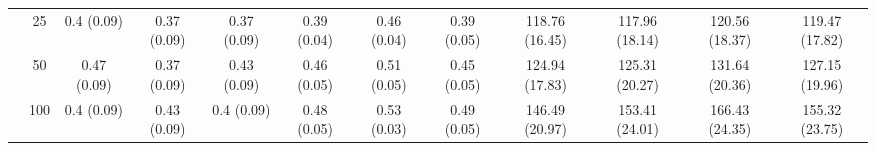 \documentclass[11pt]{article}
\theoremstyle{definition}
\begin{document}
\begin{table}[H]
\begin{center}
{\begin{tabular}{cc|ccc|ccc|cccc|}
    & 25  & 0.4 (0.09) & 0.37 (0.09) & 0.37 (0.09) & 0.39 (0.04) & 0.46 (0.04) & 0.39 (0.05) & 118.76 (16.45) & 117.96 (18.14) & 120.56 (18.37) & 119.47 (17.82) \\ 
    & 50  & 0.47 (0.09) & 0.37 (0.09) & 0.43 (0.09) & 0.46 (0.05) & 0.51 (0.05) & 0.45 (0.05) & 124.94 (17.83) & 125.31 (20.27) & 131.64 (20.36) & 127.15 (19.96) \\ 
    & 100  & 0.4 (0.09) & 0.43 (0.09) & 0.4 (0.09) & 0.48 (0.05) & 0.53 (0.03) & 0.49 (0.05) & 146.49 (20.97) & 153.41 (24.01) & 166.43 (24.35) & 155.32 (23.75) \\ 
\end{tabular}}
   \end{center}
      \vspace{-.5cm}
\end{table}
\end{document}
